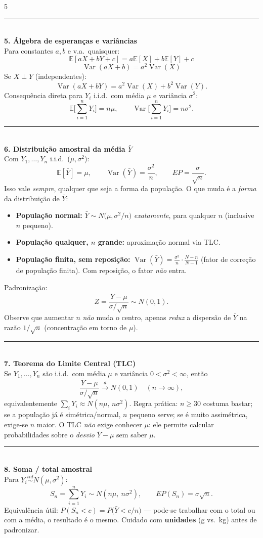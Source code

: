 \documentclass[a4paper,8pt]{extarticle}
\newcommand{\tit}[1]{\vspace{2pt}\textcolor{azul}{\rule{\linewidth}{0.6pt}}\\[1pt]\textbf{\textcolor{azul}{#1}}\\[1pt]}
\newcommand{\E}{\mathbb{E}}
\newcommand{\Var}{\operatorname{Var}}
\newcommand{\ind}{\stackrel{iid}{\sim}}
\begin{document}
\begin{multicols*}{5}
\tit{5. Álgebra de esperanças e variâncias}
Para constantes $a,b$ e v.a.\ quaisquer:
\[\E[aX+bY+c]=a\E[X]+b\E[Y]+c\]
\[\Var(aX+b)=a^2\Var(X)\]
Se $X\perp Y$ (independentes):
\[\Var(aX+bY)=a^2\Var(X)+b^2\Var(Y).\]
Consequência direta para $Y_i$ i.i.d.\ com média $\mu$ e variância $\sigma^2$:
\[\E\Big[\sum_{i=1}^n Y_i\Big]=n\mu,\qquad \Var\Big[\sum_{i=1}^n Y_i\Big]=n\sigma^2 .\]

\tit{6. Distribuição amostral da média $\bar Y$}
Com $Y_1,\dots,Y_n$ i.i.d.\ ($\mu,\sigma^2$):
\[\E[\bar Y]=\mu,\qquad \Var(\bar Y)=\frac{\sigma^2}{n},\qquad EP=\frac{\sigma}{\sqrt n}.\]
Isso vale \emph{sempre}, qualquer que seja a forma da população. O que muda é a \emph{forma} da distribuição de $\bar Y$:
\begin{itemize}
\item \textbf{População normal:} $\bar Y\sim N\!\big(\mu,\sigma^2/n\big)$ \emph{exatamente}, para qualquer $n$ (inclusive $n$ pequeno).
\item \textbf{População qualquer, $n$ grande:} aproximação normal via TLC.
\item \textbf{População finita, sem reposição:} $\Var(\bar Y)=\frac{\sigma^2}{n}\cdot\frac{N-n}{N-1}$ (fator de correção de população finita). Com reposição, o fator \emph{não} entra.
\end{itemize}
Padronização:
\[Z=\frac{\bar Y-\mu}{\sigma/\sqrt n}\sim N(0,1).\]
Observe que aumentar $n$ \emph{não} muda o centro, apenas \emph{reduz} a dispersão de $\bar Y$ na razão $1/\sqrt n$ (concentração em torno de $\mu$).

\tit{7. Teorema do Limite Central (TLC)}
Se $Y_1,\dots,Y_n$ são i.i.d.\ com média $\mu$ e variância $0<\sigma^2<\infty$, então
\[\frac{\bar Y-\mu}{\sigma/\sqrt n}\xrightarrow{d} N(0,1)\quad (n\to\infty),\]
equivalentemente $\sum_i Y_i \approx N(n\mu,\,n\sigma^2)$. Regra prática: $n\ge 30$ costuma bastar; se a população já é simétrica/normal, $n$ pequeno serve; se é muito assimétrica, exige-se $n$ maior. O TLC \emph{não} exige conhecer $\mu$: ele permite calcular probabilidades sobre o \emph{desvio} $\bar Y-\mu$ sem saber $\mu$.

\tit{8. Soma / total amostral}
Para $Y_i\ind N(\mu,\sigma^2)$:
\[S_n=\sum_{i=1}^n Y_i \sim N(n\mu,\ n\sigma^2),\qquad EP(S_n)=\sigma\sqrt n .\]
Equivalência útil: $P(S_n<c)=P\!\big(\bar Y< c/n\big)$ — pode-se trabalhar com o total ou com a média, o resultado é o mesmo. Cuidado com \textbf{unidades} (g vs.\ kg) antes de padronizar.


\end{multicols*}
\end{document}
